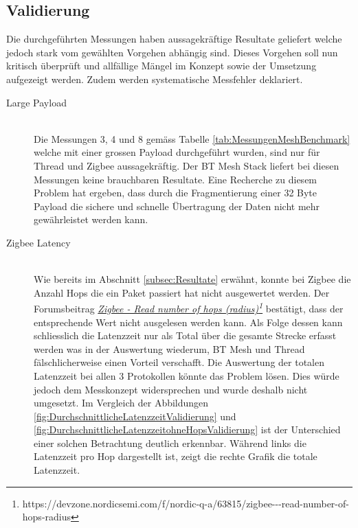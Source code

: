 \subsection{Validierung}\label{subsec:Validierung}
Die durchgeführten Messungen haben aussagekräftige Resultate geliefert welche jedoch stark vom gewählten Vorgehen abhängig sind.
Dieses Vorgehen soll nun kritisch überprüft und allfällige Mängel im Konzept sowie der Umsetzung aufgezeigt werden.
Zudem werden systematische Messfehler deklariert.

\begin{description}
\item[Large Payload]\hfill \\
Die Messungen 3, 4 und 8 gemäss Tabelle \ref{tab:MessungenMeshBenchmark} welche mit einer grossen Payload durchgeführt wurden, sind nur für Thread und Zigbee aussagekräftig. Der BT Mesh Stack liefert bei diesen Messungen keine brauchbaren Resultate.
Eine Recherche zu diesem Problem hat ergeben, dass durch die Fragmentierung einer 32 Byte Payload die sichere und schnelle Übertragung der Daten nicht mehr gewährleistet werden kann.

\item[Zigbee Latency]\hfill \\
Wie bereits im Abschnitt \ref{subsec:Resultate} erwähnt, konnte bei Zigbee die Anzahl Hops die ein Paket passiert hat nicht ausgewertet werden.
Der Forumsbeitrag \href{https://devzone.nordicsemi.com/f/nordic-q-a/63815/zigbee---read-number-of-hops-radius}{\textit{Zigbee - Read number of hops (radius)\footnote{\url{https://devzone.nordicsemi.com/f/nordic-q-a/63815/zigbee---read-number-of-hops-radius}}}} bestätigt, dass der entsprechende Wert nicht ausgelesen werden kann.
Als Folge dessen kann schliesslich die Latenzzeit nur als Total über die gesamte Strecke erfasst werden was in der Auswertung wiederum, BT Mesh und Thread fälschlicherweise einen Vorteil verschafft.
Die Auswertung der totalen Latenzzeit bei allen 3 Protokollen könnte das Problem lösen.
Dies würde jedoch dem Messkonzept widersprechen und wurde deshalb nicht umgesetzt.
Im Vergleich der Abbildungen \ref{fig:DurchschnittlicheLatenzzeitValidierung} und \ref{fig:DurchschnittlicheLatenzzeitohneHopsValidierung} ist der Unterschied einer solchen Betrachtung deutlich erkennbar.
Während links die Latenzzeit pro Hop dargestellt ist, zeigt die rechte Grafik die totale Latenzzeit.


\end{description}
